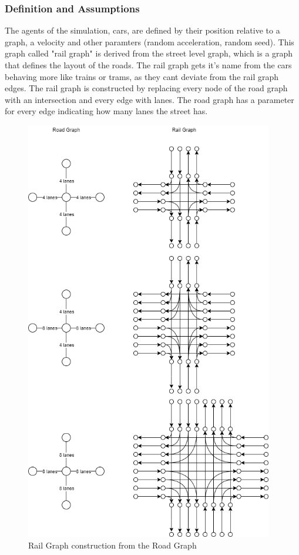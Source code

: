 \documentclass[12pt]{article}
\begin{document}
\subsubsection{Definition and Assumptions}
The agents of the simulation, cars, are defined by their position relative to a graph, a velocity and other paramters (random acceleration, random seed). This graph called "rail graph" is derived from the street level graph, which is a graph that defines the layout of the roads. The rail graph gets it's name from the cars behaving more like trains or trams, as they cant deviate from the rail graph edges. The rail graph is constructed by replacing every node of the road graph with an intersection and every edge with lanes. The road graph has a parameter for every edge indicating how many lanes the street has.
\begin{figure}[H]
\begin{center}
\includegraphics[height=18.5cm]{railgraph}
\caption{Rail Graph construction from the Road Graph}
\end{center}
\end{figure}
\end{document}
